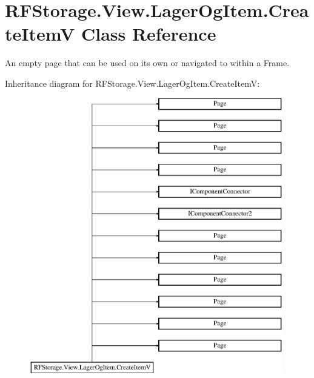 \hypertarget{class_r_f_storage_1_1_view_1_1_lager_og_item_1_1_create_item_v}{}\section{R\+F\+Storage.\+View.\+Lager\+Og\+Item.\+Create\+ItemV Class Reference}
\label{class_r_f_storage_1_1_view_1_1_lager_og_item_1_1_create_item_v}


An empty page that can be used on its own or navigated to within a Frame.  


Inheritance diagram for R\+F\+Storage.\+View.\+Lager\+Og\+Item.\+Create\+ItemV\+:\begin{figure}[H]
\begin{center}
\leavevmode
\includegraphics[height=12.000000cm]{class_r_f_storage_1_1_view_1_1_lager_og_item_1_1_create_item_v}
\end{center}
\end{figure}
